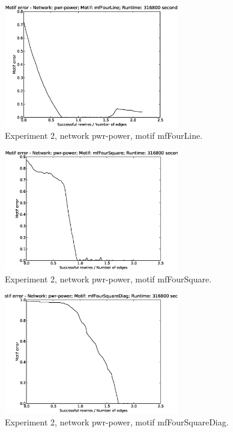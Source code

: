 \begin{figure}[p]
\centering
\includegraphics[width=3in]{Figures/motif_error-pwr-power-mfFourLine.eps}
\caption{Experiment 2, network pwr-power, motif mfFourLine.}
\label{fig:exp2-pwr-power-mfFourLine}
\end{figure}

\begin{figure}[p]
\centering
\includegraphics[width=3in]{Figures/motif_error-pwr-power-mfFourSquare.eps}
\caption{Experiment 2, network pwr-power, motif mfFourSquare.}
\label{fig:exp2-pwr-power-mfFourSquare}
\end{figure}

\begin{figure}[p]
\centering
\includegraphics[width=3in]{Figures/motif_error-pwr-power-mfFourSquareDiag.eps}
\caption{Experiment 2, network pwr-power, motif mfFourSquareDiag.}
\label{fig:exp2-pwr-power-mfFourSquareDiag}
\end{figure}

